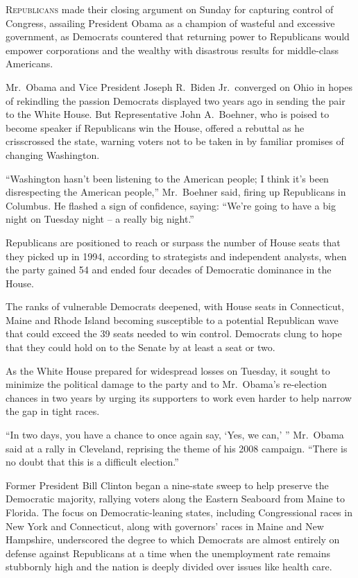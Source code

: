 ﻿\documentclass[12pt]{article}
\begin{document}
\lettrine{R}{epublicans} made their closing argument on Sunday for capturing
control of Congress, assailing President Obama as a champion of wasteful and excessive government,
as Democrats countered that returning power to Republicans would empower corporations and the
wealthy with disastrous results for middle-class Americans.

Mr.~Obama and Vice President Joseph R.~Biden Jr.~converged on Ohio in hopes of rekindling the
passion Democrats displayed two years ago in sending the pair to the White House. But Representative
John A.~Boehner, who is poised to become speaker if Republicans win the House, offered a rebuttal as
he crisscrossed the state, warning voters not to be taken in by familiar promises of changing
Washington.

``Washington hasn't been listening to the American people; I think it's been disrespecting the
American people,'' Mr.~Boehner said, firing up Republicans in Columbus. He flashed a sign of
confidence, saying: ``We're going to have a big night on Tuesday night -- a really big night.''

Republicans are positioned to reach or surpass the number of House seats that they picked up in
1994, according to strategists and independent analysts, when the party gained 54 and ended four
decades of Democratic dominance in the House.

The ranks of vulnerable Democrats deepened, with House seats in Connecticut, Maine and Rhode Island
becoming susceptible to a potential Republican wave that could exceed the 39 seats needed to win
control. Democrats clung to hope that they could hold on to the Senate by at least a seat or two.

As the White House prepared for widespread losses on Tuesday, it sought to minimize the political
damage to the party and to Mr.~Obama's re-election chances in two years by urging its supporters to
work even harder to help narrow the gap in tight races.

``In two days, you have a chance to once again say, `Yes, we can,' '' Mr.~Obama said at a rally in
Cleveland, reprising the theme of his 2008 campaign. ``There is no doubt that this is a difficult
election.''

Former President Bill Clinton began a nine-state sweep to help preserve the Democratic majority,
rallying voters along the Eastern Seaboard from Maine to Florida. The focus on Democratic-leaning
states, including Congressional races in New York and Connecticut, along with governors' races in
Maine and New Hampshire, underscored the degree to which Democrats are almost entirely on defense
against Republicans at a time when the unemployment rate remains stubbornly high and the nation is
deeply divided over issues like health care.
\end{document}
